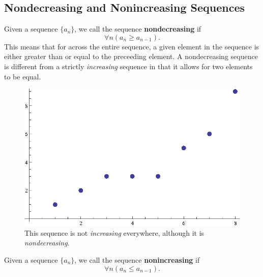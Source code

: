 \subsection{Nondecreasing and Nonincreasing Sequences}\label{nondecreasing}
\begin{defn}
  Given a sequence \(\{a_n\}\), we call the sequence \textbf{nondecreasing} if
  \[\forall n (a_n \geq a_{n-1}).\]
  This means that for across the entire sequence, a given element in the sequence is either greater than or equal to the preceeding element.
  A nondecreasing sequence is different from a strictly \emph{increasing} sequence in that it allows for two elements to be equal.
  \begin{figure}[H]
    \begin{center}
      \includegraphics[scale=0.5]{continuous/sequence/nondecreasing.eps}
    \end{center}
    \caption{This sequence is not \emph{increasing} everywhere, although it is \emph{nondecreasing}.}
  \end{figure}
\end{defn}
\begin{defn}
  Given a sequence \(\{a_n\}\), we call the sequence \textbf{nonincreasing} if
  \[\forall n (a_n \leq a_{n-1}).\]
\end{defn}
